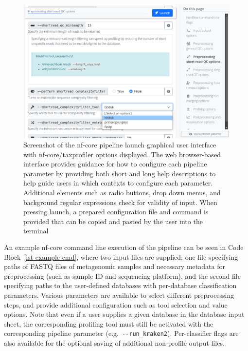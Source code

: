 \documentclass[
]{article}
\begin{document}
\begin{figure}

{\centering \includegraphics{taxprofiler_launchpage.png}

}

\caption{\label{fig-launch-page}Screenshot of the nf-core pipeline
launch graphical user interface with nf-core/taxprofiler options
displayed. The web browser-based interface provides guidance for how to
configure each pipeline parameter by providing both short and long help
descriptions to help guide users in which contexts to configure each
parameter. Additional elements such as radio buttons, drop down menus,
and background regular expressions check for validity of input. When
pressing launch, a prepared configuration file and command is provided
that can be copied and pasted by the user into the terminal}

\end{figure}

An example nf-core command line execution of the pipeline can be seen in
Code Block~\ref{lst-example-cmd}, where two input files are supplied:
one file specifying paths of FASTQ files of metagenomic samples and
necessary metadata for preprocessing (such as sample ID and sequencing
platform), and the second file specifying paths to the user-defined
databases with per-database classification parameters. Various
parameters are available to select different preprocessing steps, and
provide additional configuration such as tool selection and value
options. Note that even if a user supplies a given database in the
database input sheet, the corresponding profiling tool must still be
activated with the corresponding pipeline parameter
(e.g.~\texttt{-\/-run\_kraken2}). Per-classifier flags are also
available for the optional saving of additional non-profile output
files.
\end{document}
